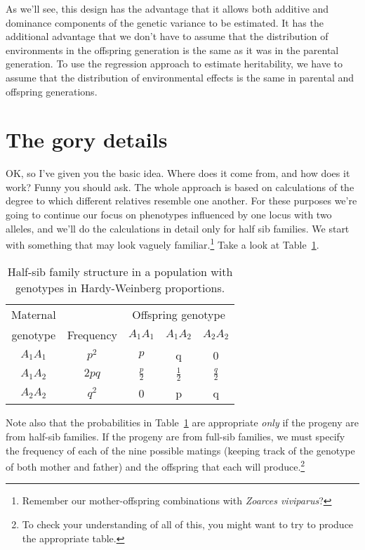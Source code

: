 As we'll see, this design has the advantage that it allows both
additive and dominance components of the genetic variance to be
estimated. It has the additional advantage that we don't have to
assume that the distribution of environments in the offspring
generation is the same as it was in the parental generation. To use
the regression approach to estimate heritability, we have to assume
that the distribution of environmental effects is the same in parental
and offspring generations.

\section*{The gory details}

OK, so I've given you the basic idea. Where does it come from, and how
does it work? Funny you should ask. The whole approach is based on
calculations of the degree to which different relatives resemble one
another. For these purposes we're going to continue our focus on
phenotypes influenced by one locus with two alleles, and we'll do the
calculations in detail only for half sib families. We start with
something that may look vaguely familiar.\footnote{Remember our
  mother-offspring combinations with {\it Zoarces viviparus\/}?} Take
a look at Table~\ref{table:half-sib}.

\begin{table}
\begin{center}
\begin{tabular}{c|c|ccc}
\hline\hline
Maternal &           & \multicolumn{3}{c}{Offspring genotype} \\
genotype & Frequency & $A_1A_1$      & $A_1A_2$      & $A_2A_2$ \\
\hline
$A_1A_1$ & $p^2$     & $p$           & q             & 0 \\
$A_1A_2$ & $2pq$     & $\frac{p}{2}$ & $\frac{1}{2}$ & $\frac{q}{2}$ \\
$A_2A_2$ & $q^2$     & 0             & p             & q \\
\hline
\end{tabular}
\end{center}
\caption{Half-sib family structure in a population with genotypes in
  Hardy-Weinberg proportions.}\label{table:half-sib}
\end{table}

Note also that the probabilities in Table~\ref{table:half-sib} are
appropriate {\it only\/} if the progeny are from half-sib families.
If the progeny are from full-sib families, we must specify the
frequency of each of the nine possible matings (keeping track of the
genotype of both mother and father) and the offspring that each will
produce.\footnote{To check your understanding of all of this, you
might want to try to produce the appropriate table.}

